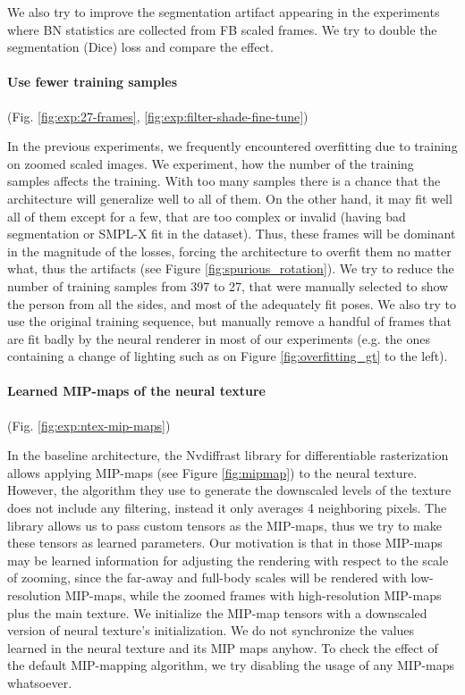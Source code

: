 We also try to improve the segmentation artifact appearing in the experiments where BN statistics are collected from FB scaled frames. We try to double the segmentation (Dice) loss and compare the effect.

\vspace{-15pt}\paragraph{Use fewer training samples}(Fig. \ref{fig:exp:27-frames}, \ref{fig:exp:filter-shade-fine-tune})\mbox{}\nopagebreak

In the previous experiments, we frequently encountered overfitting due to training on zoomed scaled images. We experiment, how the number of the training samples affects the training. With too many samples there is a chance that the architecture will generalize well to all of them. On the other hand, it may fit well all of them except for a few, that are too complex or invalid (having bad segmentation or SMPL-X fit in the dataset). Thus, these frames will be dominant in the magnitude of the losses, forcing the architecture to overfit them no matter what, thus the artifacts (see Figure \ref{fig:spurious_rotation}). We try to reduce the number of training samples from 397 to 27, that were manually selected to show the person from all the sides, and most of the adequately fit poses. We also try to use the original training sequence, but manually remove a handful of frames that are fit badly by the neural renderer in most of our experiments (e.g. the ones containing a change of lighting such as on Figure \ref{fig:overfitting_gt} to the left).

\vspace{-15pt}\paragraph{Learned MIP-maps of the neural texture}(Fig. \ref{fig:exp:ntex-mip-maps})\mbox{}\nopagebreak

In the baseline architecture, the Nvdiffrast library \cite{aux:nvdiffrast20} for differentiable rasterization allows applying MIP-maps (see Figure \ref{fig:mipmap}) to the neural texture. However, the algorithm they use to generate the downscaled levels of the texture does not include any filtering, instead it only averages 4 neighboring pixels. The library allows us to pass custom tensors as the MIP-maps, thus we try to make these tensors as learned parameters. Our motivation is that in those MIP-maps may be learned information for adjusting the rendering with respect to the scale of zooming, since the far-away and full-body scales will be rendered with low-resolution MIP-maps, while the zoomed frames with high-resolution MIP-maps plus the main texture. We initialize the MIP-map tensors with a downscaled version of neural texture's initialization. We do not synchronize the values learned in the neural texture and its MIP maps anyhow. To check the effect of the default MIP-mapping algorithm, we try disabling the usage of any MIP-maps whatsoever.

